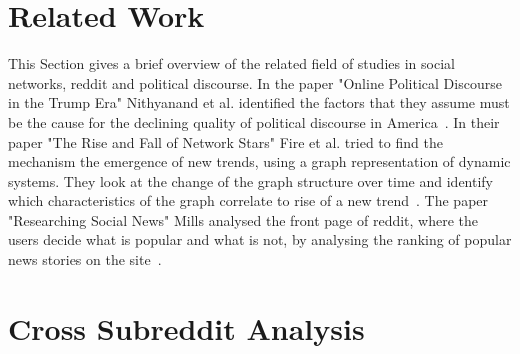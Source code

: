 \documentclass[runningheads,a4paper]{llncs}
\begin{document}
	\section{Related Work}
	This Section gives a brief overview of the related field of studies in social networks, reddit and political discourse.
	In the paper "Online Political Discourse in the Trump Era" Nithyanand et al. identified the factors that they assume must be the cause for the declining quality of political discourse in America~\cite{nithyanand2017online}.
	In their paper "The Rise and Fall of Network Stars" Fire et al. tried to find the mechanism the emergence of new trends, using a graph representation of dynamic systems. They look at the change of the graph structure over time and identify which characteristics of the graph correlate to rise of a new trend~\cite{fire2017rise}.
	The paper "Researching Social News" Mills analysed the front page of reddit, where the users decide what is popular and what is not, by analysing the ranking of popular news stories on the site~\cite{mills2011researching}.
	
	
	\section{Cross Subreddit Analysis}\label{sec:CrossSubredditAnalysis}
	
	
\end{document}
